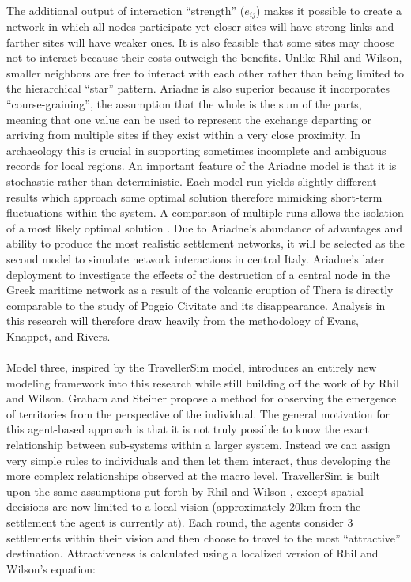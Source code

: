 \documentclass[12pt,a4paper]{thesis}
\begin{document}
\paragraph{}
The additional output of interaction ``strength'' ($e_{ij}$) makes it possible to create a network in which all nodes participate yet closer sites will have strong links and farther sites will have weaker ones. It is also feasible that some sites may choose not to interact because their costs outweigh the benefits. Unlike Rhil and Wilson, smaller neighbors are free to interact with each other rather than being limited to the hierarchical ``star'' pattern. Ariadne is also superior because it incorporates ``course-graining'', the assumption that the whole is the sum of the parts, meaning that one value can be used to represent the exchange departing or arriving from multiple sites if they exist within a very close proximity. In archaeology this is crucial in supporting sometimes incomplete and ambiguous records for local regions. An important feature of the Ariadne model is that it is stochastic rather than deterministic. Each model run yields slightly different results which approach some optimal solution therefore mimicking short-term fluctuations within the system. A comparison of multiple runs allows the isolation of a most likely optimal solution \citep[12]{ERK12}. Due to Ariadne's abundance of advantages and ability to produce the most realistic settlement networks, it will be selected as the second model to simulate network interactions in central Italy. Ariadne's later deployment to investigate the effects of the destruction of a central node in the Greek maritime network as a result of the volcanic eruption of Thera \citep{KnaRivEva11} is directly comparable to the study of Poggio Civitate and its disappearance. Analysis in this research will therefore draw heavily from the methodology of Evans, Knappet, and Rivers.
	
\paragraph{}
Model three, inspired by the TravellerSim model, introduces an entirely new modeling framework into this research while still building off the work of by Rhil and Wilson. Graham and Steiner \citeyearpar{GraSte08} propose a method for observing the emergence of territories from the perspective of the individual. The general motivation for this agent-based approach is that it is not truly possible to know the exact relationship between sub-systems within a larger system. Instead we can assign very simple rules to individuals and then let them interact, thus developing the more complex relationships observed at the macro level. TravellerSim is built upon the same assumptions put forth by Rhil and Wilson \citep[64, 71]{RihWil91}, except spatial decisions are now limited to a local vision (approximately 20km from the settlement the agent is currently at). Each round, the agents consider 3 settlements within their vision and then choose to travel to the most ``attractive'' destination. Attractiveness is calculated using a localized version of Rhil and Wilson's equation:
\end{document}
